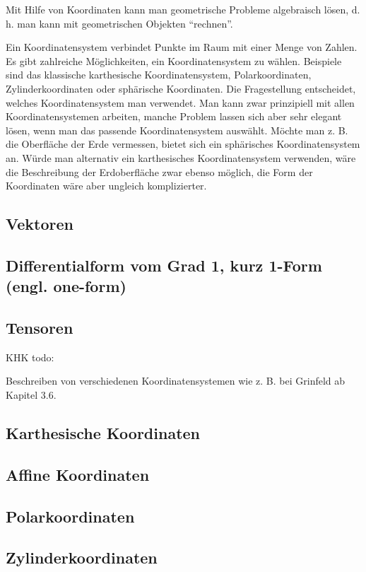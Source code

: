 \documentclass[11pt,a4paper]{article}
\begin{document}
Mit Hilfe von Koordinaten kann man geometrische Probleme algebraisch lösen, d. h. man kann mit geometrischen Objekten "`rechnen"'. 

Ein Koordinatensystem verbindet Punkte im Raum mit einer Menge von Zahlen. Es gibt zahlreiche Möglichkeiten, ein Koordinatensystem zu wählen. Beispiele sind das klassische karthesische Koordinatensystem, Polarkoordinaten, Zylinderkoordinaten oder sphärische Koordinaten. Die Fragestellung entscheidet, welches Koordinatensystem man verwendet. Man kann zwar prinzipiell mit allen Koordinatensystemen arbeiten, manche Problem lassen sich aber sehr elegant lösen, wenn man das passende Koordinatensystem auswählt. Möchte man z. B. die Oberfläche der Erde vermessen, bietet sich ein sphärisches Koordinatensystem an. Würde man alternativ ein karthesisches Koordinatensystem verwenden, wäre die Beschreibung der Erdoberfläche zwar ebenso möglich, die Form der Koordinaten wäre aber ungleich komplizierter.

\subsection{Vektoren}
\subsection{ Differentialform vom Grad 1, kurz 1-Form (engl. one-form)}
\subsection{Tensoren}


KHK todo:

Beschreiben von verschiedenen Koordinatensystemen wie z. B. bei Grinfeld ab Kapitel 3.6.

\subsection{Karthesische Koordinaten}

\subsection{Affine Koordinaten}

\subsection{Polarkoordinaten}

\subsection{Zylinderkoordinaten}
\end{document}
